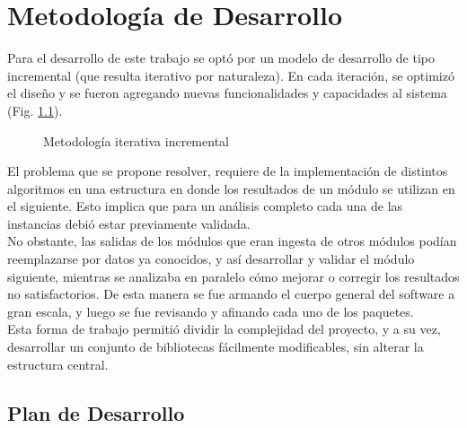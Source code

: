 \chapter{Metodología de Desarrollo}
\label{chap:metodologia}
 
Para el desarrollo de este trabajo se opt\'o por un modelo de desarrollo de tipo incremental (que resulta iterativo por naturaleza).
En cada iteraci\'on, se optimiz\'o el dise\~no y se fueron agregando nuevas funcionalidades y capacidades al sistema (Fig. \ref{fig:metodologiaIncremental}).\\

\begin{figure}[!h]
  \centering
  \caption{Metodolog\'ia iterativa incremental}
  \label{fig:metodologiaIncremental}
\end{figure}

El problema que se propone resolver, requiere de la implementaci\'on de distintos algoritmos en una estructura en donde los resultados de un m\'odulo se utilizan en el siguiente. Esto implica que para un an\'alisis completo cada una de las instancias debi\'o estar previamente validada. \\

No obstante, las salidas de los m\'odulos que eran ingesta de otros m\'odulos pod\'ian reemplazarse por datos ya conocidos, y as\'i desarrollar y validar el m\'odulo siguiente, mientras se analizaba en paralelo c\'omo mejorar o corregir los resultados no satisfactorios. De esta manera se fue armando el cuerpo general del software a gran escala, y luego se fue revisando y afinando cada uno de los paquetes.\\

Esta forma de trabajo permiti\'o dividir la complejidad del proyecto, y a su vez, desarrollar un conjunto de bibliotecas f\'acilmente modificables, sin alterar la estructura central.


\section{Plan de Desarrollo}

